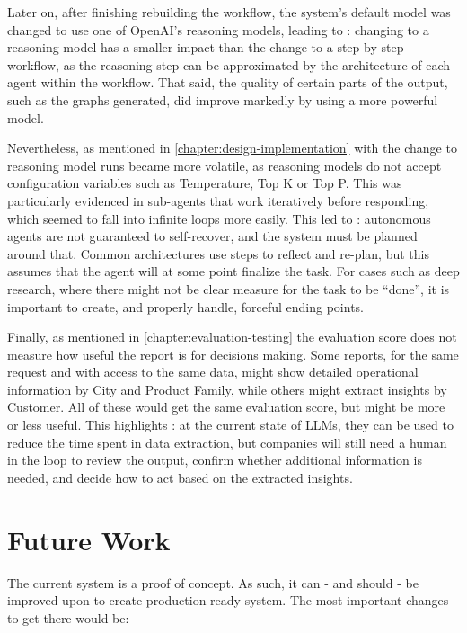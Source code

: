 \documentclass[a4paper]{report}
\begin{document}
Later on, after finishing rebuilding the workflow, the system's default model was changed to use one of OpenAI's reasoning models, leading to \kfid : changing to a reasoning model has a smaller impact than the change to a step-by-step workflow, as the reasoning step can be approximated by the architecture of each agent within the workflow. That said, the quality of certain parts of the output, such as the graphs generated, did improve markedly by using a more powerful model.

Nevertheless, as mentioned in \autoref{chapter:design-implementation} with the change to reasoning model runs became more volatile, as reasoning models do not accept configuration variables such as Temperature, Top K or Top P. This was particularly evidenced in sub-agents that work iteratively before responding, which seemed to fall into infinite loops more easily. This led to \kfid : autonomous agents are not guaranteed to self-recover, and the system must be planned around that. Common architectures use steps to reflect and re-plan, but this assumes that the agent will at some point finalize the task. For cases such as deep research, where there might not be clear measure for the task to be ``done'', it is important to create, and properly handle, forceful ending points.

Finally, as mentioned in \autoref{chapter:evaluation-testing} the evaluation score does not measure how useful the report is for decisions making. Some reports, for the same request and with access to the same data, might show detailed operational information by City and Product Family, while others might extract insights by Customer. All of these would get the same evaluation score, but might be more or less useful. This highlights \kfid : at the current state of LLMs, they can be used to reduce the time spent in data extraction, but companies will still need a human in the loop to review the output, confirm whether additional information is needed, and decide how to act based on the extracted insights.

\section{Future Work}
\label{sec:future-work}

The current system is a proof of concept. As such, it can - and should - be improved upon to create production-ready system. The most important changes to get there would be:
\end{document}
